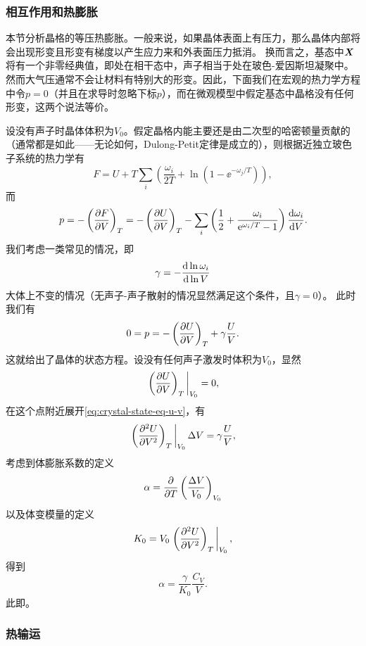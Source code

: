 \subsubsection{相互作用和热膨胀}

本节分析晶格的等压热膨胀。一般来说，如果晶体表面上有压力，那么晶体内部将会出现形变且形变有梯度以产生应力来和外表面压力抵消。
换而言之，基态中$\vb*{X}$将有一个非零经典值，即处在相干态中，声子相当于处在玻色-爱因斯坦凝聚中。
然而大气压通常不会让材料有特别大的形变。因此，下面我们在宏观的热力学方程中令$p=0$（并且在求导时忽略下标$p$），而在微观模型中假定基态中晶格没有任何形变，这两个说法等价。

设没有声子时晶体体积为$V_0$。假定晶格内能主要还是由二次型的哈密顿量贡献的（通常都是如此——无论如何，Dulong-Petit定律是成立的），则根据近独立玻色子系统的热力学有
\[
    F = U + T \sum_i \left( \frac{\omega_i}{2 T} + \ln(1 - \ee^{- \omega_j / T}) \right),
\]
而
\[
    p = - \left(\pdv{F}{V}\right)_{T} = - \left(\pdv{U}{V}\right)_T - \sum_i \left( \frac{1}{2} + \frac{\omega_i}{\mathrm{e}^{\omega_i / T} - 1} \right) \dv{\omega_i}{V}.
\]
我们考虑一类常见的情况，即
\begin{equation}
    \gamma = - \dv{\ln \omega_i}{\ln V}
\end{equation}
大体上不变的情况（无声子-声子散射的情况显然满足这个条件，且$\gamma = 0$）。
此时我们有
\begin{equation}
    0 = p = - \left(\pdv{U}{V}\right)_T + \gamma \frac{U}{V}.
    \label{eq:crystal-state-eq-u-v}
\end{equation}
这就给出了晶体的状态方程。设没有任何声子激发时体积为$V_0$，显然
\[
    \eval{\left(\pdv{U}{V}\right)_T}_{V_0} = 0,
\]
在这个点附近展开\eqref{eq:crystal-state-eq-u-v}，有
\[
    \eval{\left(\pdv[2]{U}{V}\right)_T}_{V_0} \Delta V = \gamma \frac{U}{V},
\]
考虑到体膨胀系数的定义
\[
    \alpha = \pdv{T} \left(\frac{\Delta V}{V_0}\right)_{V_0}
\]
以及体变模量的定义
\[
    K_0 = V_0 \eval{\left(\pdv[2]{U}{V}\right)_T}_{V_0},
\]
得到
\begin{equation}
    \alpha = \frac{\gamma}{K_0} \frac{C_V}{V}.
\end{equation}
此即。

\subsubsection{热输运}

